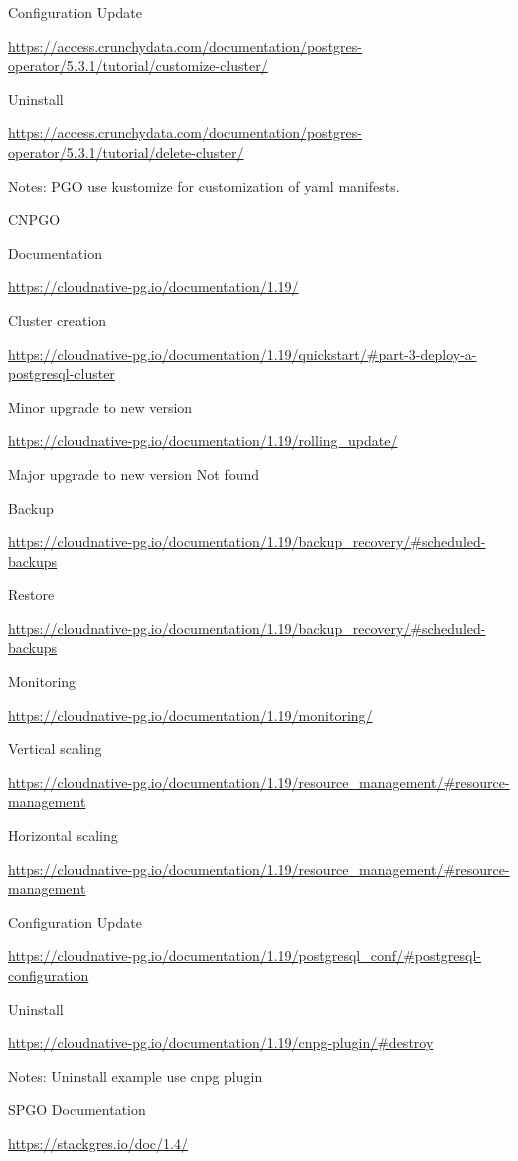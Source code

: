 Configuration Update

\url{https://access.crunchydata.com/documentation/postgres-operator/5.3.1/tutorial/customize-cluster/}

Uninstall

\url{https://access.crunchydata.com/documentation/postgres-operator/5.3.1/tutorial/delete-cluster/}

Notes: PGO use kustomize for customization of yaml manifests.

CNPGO

Documentation

\url{https://cloudnative-pg.io/documentation/1.19/}

Cluster creation

\url{https://cloudnative-pg.io/documentation/1.19/quickstart/#part-3-deploy-a-postgresql-cluster}

Minor upgrade to new version

\url{https://cloudnative-pg.io/documentation/1.19/rolling_update/}

Major upgrade to new version
Not found

Backup

\url{https://cloudnative-pg.io/documentation/1.19/backup_recovery/#scheduled-backups}

Restore

\url{https://cloudnative-pg.io/documentation/1.19/backup_recovery/#scheduled-backups}

Monitoring

\url{https://cloudnative-pg.io/documentation/1.19/monitoring/}

Vertical scaling

\url{https://cloudnative-pg.io/documentation/1.19/resource_management/#resource-management}

Horizontal scaling

\url{https://cloudnative-pg.io/documentation/1.19/resource_management/#resource-management}

Configuration Update

\url{https://cloudnative-pg.io/documentation/1.19/postgresql_conf/#postgresql-configuration}

Uninstall

\url{https://cloudnative-pg.io/documentation/1.19/cnpg-plugin/#destroy}

Notes: Uninstall example use cnpg plugin

SPGO
Documentation

\url{https://stackgres.io/doc/1.4/}

